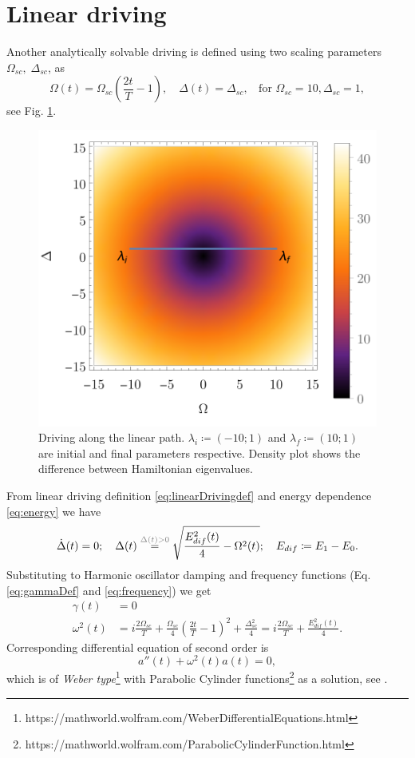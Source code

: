 \newpage 
\section{Linear driving}
Another analytically solvable driving is defined using two scaling parameters $\Omega_{sc},\;\Delta_{sc}$, as 
\begin{equation}
    \Omega(t)=\Omega_{sc}\left(\frac{2t}{T}-1\right),\quad \Delta(t)=\Delta_{sc}, \;\;\text{ for } \Omega_{sc}=10, \Delta_{sc}=1,
    \label{eq:linearDrivingdef}
\end{equation}
see Fig. \ref{fig:driving1}. 
\begin{figure}[H]
    \centering
    \includegraphics[scale=1.2]{../img/drivingLin.pdf}
    \caption{Driving along the linear path. $\lambda_i\coloneqq(-10;1)$ and $\lambda_f\coloneqq(10;1)$ are initial and final parameters respective. Density plot shows the difference between Hamiltonian eigenvalues.}
    \label{fig:driving1}
\end{figure}

From linear driving definition \ref{eq:linearDrivingdef} and energy dependence \ref{eq:energy} we have
\begin{equation}
    \dot \Delta(t)=0;\quad \Delta(t) \overset{\textcolor{gray}{\Delta(t)>0}}{=} \sqrt{\frac{E^2_{dif}(t)}{4}-\Omega^2(t)};\quad E_{dif}\coloneqq E_1-E_0.
\end{equation}
Substituting to Harmonic oscillator damping and frequency functions (Eq. \ref{eq:gammaDef} and \ref{eq:frequency}) we get 
\begin{align}
    \gamma(t) &= 0\\
    \omega^2(t)&=i\frac{2\Omega_{sc}}{T}+\frac{\Omega_{sc}}{4}\left(\frac{2t}{T}-1\right)^2+\frac{\Delta_{sc}^2}{4}=i\frac{2\Omega_{sc}}{T}+\frac{E^2_{dif}(t)}{4}.
    \label{eq:oscillationsLinear}
\end{align}
Corresponding differential equation of second order is
\begin{equation}
    a''(t)+\omega^2(t) a(t)=0,
\end{equation}
which is of \emph{Weber type}\footnote{https://mathworld.wolfram.com/WeberDifferentialEquations.html} with Parabolic Cylinder functions\footnote{https://mathworld.wolfram.com/ParabolicCylinderFunction.html} as a solution, see \citet{felipe}. 

